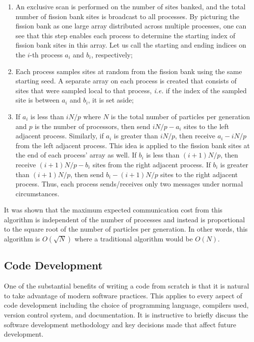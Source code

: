 \documentclass[authoryear,preprint]{elsarticle}
\begin{document}
\begin{enumerate}
\item An exclusive scan is performed on the number of sites banked, and the
  total number of fission bank sites is broadcast to all processes. By
  picturing the fission bank as one large array distributed across multiple
  processes, one can see that this step enables each process to determine the
  starting index of fission bank sites in this array. Let us call the starting
  and ending indices on the $i$-th process $a_i$ and $b_i$, respectively;
\item Each process samples sites at random from the fission bank using the same
  starting seed. A separate array on each process is created that consists of
  sites that were sampled local to that process, {\em i.e.} if the index of the
  sampled site is between $a_i$ and $b_i$, it is set aside;
\item If $a_i$ is less than $iN/p$ where $N$ is the total number of particles
  per generation and $p$ is the number of processors, then send $iN/p - a_i$
  sites to the left adjacent process. Similarly, if $a_i$ is greater than
  $iN/p$, then receive $a_i - iN/p$ from the left adjacent process. This idea is
  applied to the fission bank sites at the end of each process' array as
  well. If $b_i$ is less than $(i+1)N/p$, then receive $(i+1)N/p - b_i$ sites
  from the right adjacent process. If $b_i$ is greater than $(i+1)N/p$, then
  send $b_i - (i+1)N/p$ sites to the right adjacent process. Thus, each process
  sends/receives only two messages under normal circumstances.
\end{enumerate}

It was shown \citep{fissionbank} that the maximum expected communication cost
from this algorithm is independent of the number of processes and instead is
proportional to the square root of the number of particles per generation. In
other words, this algorithm is $O({\sqrt{N}})$ where a traditional algorithm
would be $O({N})$.

\subsection{Code Development}

One of the substantial benefits of writing a code from scratch is that it is
natural to take advantage of modern software practices. This applies to every
aspect of code development including the choice of programming language,
compilers used, version control system, and documentation. It is instructive to
briefly discuss the software development methodology and key decisions made that
affect future development.
\end{document}
